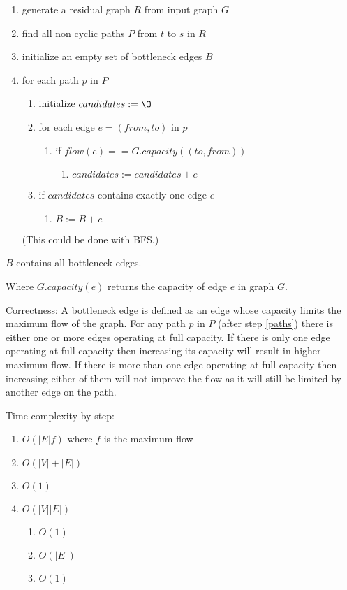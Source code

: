 \documentclass[12pt]{article}
\begin{document}
\begin{enumerate}
	\item generate a residual graph $R$ from input graph $G$
	\item find all non cyclic paths $P$ from $t$ to $s$ in $R$ \label{paths}
	\item initialize an empty set of bottleneck edges $B$
	\item for each path $p$ in $P$
		\begin{enumerate}
			\item initialize $candidates := \O$
			\item for each edge $e = (from, to)$ in $p$
			\begin{enumerate}
				\item if $flow(e) == G.capacity((to, from))$
				\begin{enumerate}
					\item $candidates := candidates + e$
				\end{enumerate}
			\end{enumerate}
			\item if $candidates$ contains exactly one edge $e$
			\begin{enumerate}
				\item $B := B + e$
			\end{enumerate}
		\end{enumerate}

	(This could be done with BFS.)
\end{enumerate}

$B$ contains all bottleneck edges.

Where $G.capacity(e)$ returns the capacity of edge $e$ in graph $G$.

Correctness: A bottleneck edge is defined as an edge whose capacity limits the maximum flow of the graph. For any path $p$ in $P$ (after step \ref{paths}) there is either one or more edges operating at full capacity. If there is only one edge operating at full capacity then increasing its capacity will result in higher maximum flow. If there is more than one edge operating at full capacity then increasing either of them will not improve the flow as it will still be limited by another edge on the path.

Time complexity by step:
\begin{enumerate}
	\item $O(|E|f)$ where $f$ is the maximum flow
	\item $O(|V| + |E|)$
	\item $O(1)$
	\item $O(|V||E|)$
	\begin{enumerate}
		\item $O(1)$
		\item $O(|E|)$
		\item $O(1)$
	\end{enumerate}
\end{enumerate}

\section{} %
\section{} %
\end{document}
